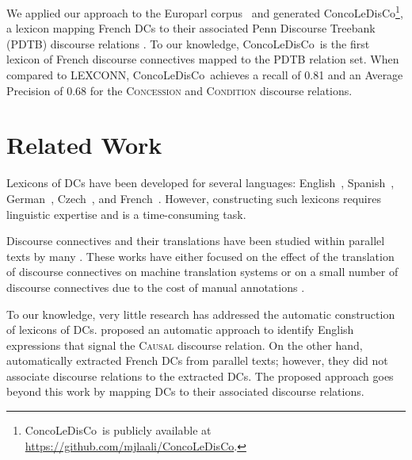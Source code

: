 \documentclass[11pt,a4paper]{article}
\def \dict {ConcoLeDisCo}
\begin{document}
We applied our approach to the Europarl corpus~\cite{koehn05} and generated \dict\footnote{\dict~is publicly available at \url{https://github.com/mjlaali/ConcoLeDisCo}.}, a lexicon mapping French DCs to their associated Penn Discourse Treebank (PDTB) discourse relations \cite{prasad08}. To our knowledge, \dict\ is the first lexicon of French discourse connectives mapped to the PDTB relation set. When compared to LEXCONN, \dict\ achieves a recall of 0.81 and an Average Precision of 0.68 for the \textsc{Concession} and \textsc{Condition} discourse relations.
 

\section{Related Work}
\label{sec:related-work}

Lexicons of DCs have been developed for several languages: English~\cite{knott96}, Spanish~\cite{alonsoalemany02}, German~\cite{stede98}, Czech~\cite{polakova13}, and French~\cite{roze12}. However, constructing such lexicons requires linguistic expertise and is a time-consuming task. 

Discourse connectives and their translations have been studied within parallel texts by many \cite{meyer11,meyer11-a,taboada12,cartoni13,zufferey14,zufferey14-a,zufferey15,hoek15}. These works have either focused on the effect of the translation of discourse connectives on machine translation systems \cite{meyer11,meyer11-a,cartoni13} or on a small number of discourse connectives due to the cost of manual annotations \cite{taboada12,zufferey14,zufferey14-a,zufferey15,hoek15}.

To our knowledge, very little research has addressed the automatic construction of lexicons of DCs. \citet{hidey16} proposed an automatic approach to identify English expressions that signal the \textsc{Causal} discourse relation. On the other hand, \citet{laali14} automatically extracted French DCs from parallel texts; however, they did not associate discourse relations to the extracted DCs. The proposed approach goes beyond this work by mapping DCs to their associated discourse relations. 
\end{document}
